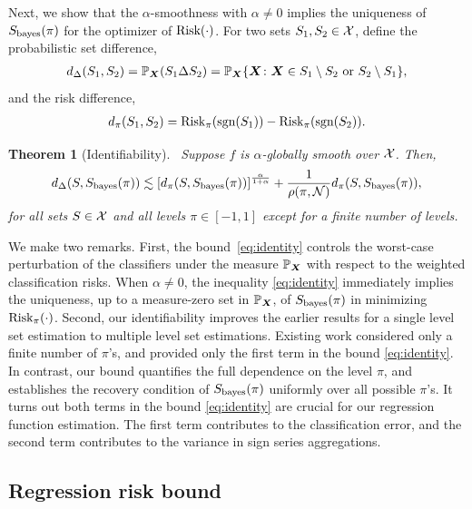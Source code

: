 \documentclass[aos]{imsart}
\newtheorem{theorem}{Theorem}%
\theoremstyle{definition}
\def\sign{\textup{sgn}}
\def\risk{\textup{Risk}}
\def\bayesS{S_{\textup{bayes}}}
\begin{document}
Next, we show that the $\alpha$-smoothness with $\alpha\neq 0$ implies the uniqueness of $\bayesS(\pi)$ for the optimizer of $\risk(\cdot)$. For two sets $S_1, S_2\in \mathcal{X}$, define the probabilistic set difference, 
\begin{align*} 
d_{\Delta}(S_1,S_2) = \mathbb{P}_{\mX}(S_1\Delta S_2)=\mathbb{P}_{\mX}\{\mX\colon \mX\in S_1\setminus S_2 \text{ or }S_2\setminus S_1\},
\end{align*}
and the risk difference,
\begin{align*} 
d_\pi(S_1,S_2) = \risk_\pi(\sign(S_1))-\risk_\pi(\sign(S_2)).
\end{align*}

\begin{theorem}[Identifiability]~\label{thm:identifiability} Suppose $f$ is $\alpha$-globally smooth over $\mathcal{X}$. Then,
\begin{align}\label{eq:identity}
d_{\Delta}(S,\bayesS(\pi)) \lesssim \left[d_\pi(S,\bayesS(\pi))\right]^{\alpha\over 1+\alpha}+{1\over\rho(\pi, \tN)} d_\pi(S,\bayesS(\pi)),
\end{align}
for all sets $S\in\mathcal{X}$ and all levels $\pi\in[-1,1]$ except for a finite number of levels.
\end{theorem}

\noindent
We make two remarks. First, the bound~\eqref{eq:identity} controls the worst-case perturbation of the classifiers under the measure $\mathbb{P}_{\bm X}$ with respect to the weighted classification risks. When $\alpha \neq 0$, the inequality \eqref{eq:identity} immediately implies the uniqueness, up to a measure-zero set in $\mathbb{P}_{\bm X}$, of $\bayesS(\pi)$ in minimizing $\risk_\pi(\cdot)$. Second, our identifiability improves the earlier results for a single level set estimation to multiple level set estimations. Existing work \citep{singh2009adaptive,xu2020class} considered only a finite number of $\pi$'s, and provided only the first term in the bound \eqref{eq:identity}. In contrast, our bound quantifies the full dependence on the level $\pi$, and establishes the recovery condition of $\bayesS(\pi)$ uniformly over all possible $\pi$'s. It turns out both terms in the bound \eqref{eq:identity} are crucial for our regression function estimation. The first term contributes to the classification error, and the second term contributes to the variance in sign series aggregations. 



\subsection{Regression risk bound}
\end{document}
